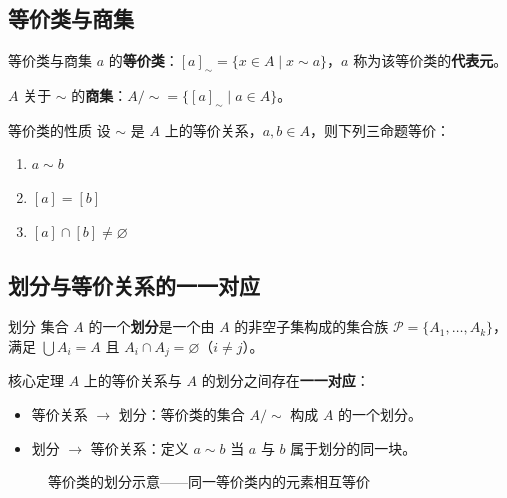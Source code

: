 \subsection{等价类与商集}

\begin{mydefinition}{等价类与商集}
$a$ 的\textbf{等价类}：$[a]_\sim = \{x \in A \mid x \sim a\}$，$a$ 称为该等价类的\textbf{代表元}。

$A$ 关于 $\sim$ 的\textbf{商集}：$A/{\sim} = \{[a]_\sim \mid a \in A\}$。
\end{mydefinition}

\begin{myTheorem}{等价类的性质}
设 $\sim$ 是 $A$ 上的等价关系，$a,b \in A$，则下列三命题等价：
\begin{enumerate}
\item $a \sim b$
\item $[a] = [b]$
\item $[a] \cap [b] \neq \varnothing$
\end{enumerate}
\end{myTheorem}

\subsection{划分与等价关系的一一对应}

\begin{mydefinition}{划分}
集合 $A$ 的一个\textbf{划分}是一个由 $A$ 的非空子集构成的集合族 $\mathcal{P} = \{A_1,\dots,A_k\}$，满足 $\bigcup A_i = A$ 且 $A_i \cap A_j = \varnothing$（$i \neq j$）。
\end{mydefinition}

\begin{myTheorem}{核心定理}
$A$ 上的等价关系与 $A$ 的划分之间存在\textbf{一一对应}：
\begin{itemize}
\item 等价关系 $\rightarrow$ 划分：等价类的集合 $A/{\sim}$ 构成 $A$ 的一个划分。
\item 划分 $\rightarrow$ 等价关系：定义 $a \sim b$ 当 $a$ 与 $b$ 属于划分的同一块。
\end{itemize}
\end{myTheorem}

\begin{figure}[H]
\centering
{}
\caption{等价类的划分示意——同一等价类内的元素相互等价}
\end{figure}

